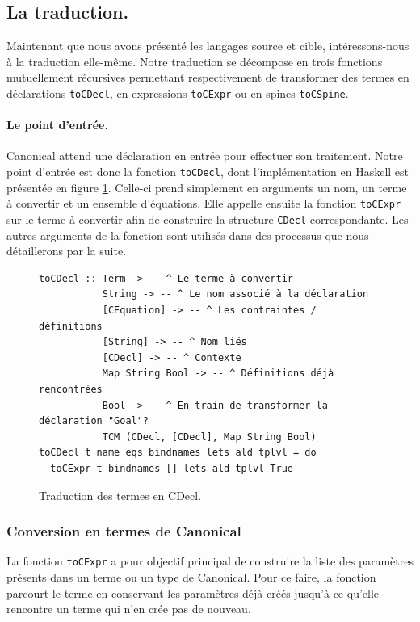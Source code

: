 \documentclass[11pt]{article}
\begin{document}
\subsection{La traduction.}
Maintenant que nous avons présenté les langages source et cible, intéressons-nous à la traduction elle-même.
Notre traduction se décompose en trois fonctions mutuellement récursives permettant respectivement de transformer des termes en déclarations 
\texttt{toCDecl}, en expressions \texttt{toCExpr} ou en spines \texttt{toCSpine}.

\paragraph{Le point d'entrée.}
Canonical attend une déclaration en entrée pour effectuer son traitement. Notre point d'entrée est donc la fonction \texttt{toCDecl}, dont l'implémentation en Haskell est présentée en figure \ref{fig:agda-toCDecl}.
Celle-ci prend simplement en arguments un nom, un terme à convertir et un ensemble d'équations. Elle appelle ensuite la fonction \texttt{toCExpr} sur le terme à convertir afin de construire la structure \texttt{CDecl} correspondante.
Les autres arguments de la fonction sont utilisés dans des processus que nous détaillerons par la suite.



\begin{figure}[h]
\centering
\begin{verbatim}
toCDecl :: Term -> -- ^ Le terme à convertir
           String -> -- ^ Le nom associé à la déclaration
           [CEquation] -> -- ^ Les contraintes / définitions
           [String] -> -- ^ Nom liés
           [CDecl] -> -- ^ Contexte
           Map String Bool -> -- ^ Définitions déjà rencontrées
           Bool -> -- ^ En train de transformer la déclaration "Goal"?
           TCM (CDecl, [CDecl], Map String Bool)
toCDecl t name eqs bindnames lets ald tplvl = do
  toCExpr t bindnames [] lets ald tplvl True
\end{verbatim}
\caption{Traduction des termes en CDecl.}
\label{fig:agda-toCDecl}
\end{figure}

\subsubsection{Conversion en termes de Canonical}
La fonction \texttt{toCExpr} a pour objectif principal de construire la liste des paramètres présents dans un terme ou un type de Canonical.
Pour ce faire, la fonction parcourt le terme en conservant les paramètres déjà créés jusqu'à ce qu'elle rencontre un terme qui n'en crée pas de nouveau.
\end{document}
